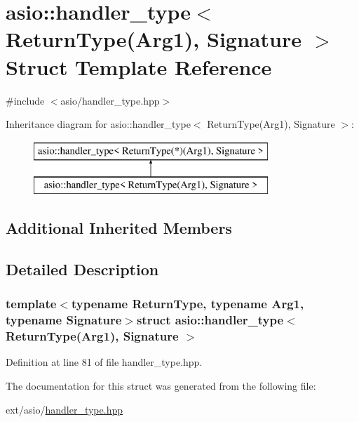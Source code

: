 \hypertarget{structasio_1_1handler__type_3_01_return_type_07_arg1_08_00_01_signature_01_4}{}\section{asio\+:\+:handler\+\_\+type$<$ Return\+Type(Arg1), Signature $>$ Struct Template Reference}
\label{structasio_1_1handler__type_3_01_return_type_07_arg1_08_00_01_signature_01_4}


{\ttfamily \#include $<$asio/handler\+\_\+type.\+hpp$>$}

Inheritance diagram for asio\+:\+:handler\+\_\+type$<$ Return\+Type(Arg1), Signature $>$\+:\begin{figure}[H]
\begin{center}
\leavevmode
\includegraphics[height=2.000000cm]{structasio_1_1handler__type_3_01_return_type_07_arg1_08_00_01_signature_01_4}
\end{center}
\end{figure}
\subsection*{Additional Inherited Members}


\subsection{Detailed Description}
\subsubsection*{template$<$typename Return\+Type, typename Arg1, typename Signature$>$struct asio\+::handler\+\_\+type$<$ Return\+Type(\+Arg1), Signature $>$}



Definition at line 81 of file handler\+\_\+type.\+hpp.



The documentation for this struct was generated from the following file\+:\begin{DoxyCompactItemize}
\item 
ext/asio/\hyperlink{handler__type_8hpp}{handler\+\_\+type.\+hpp}\end{DoxyCompactItemize}
